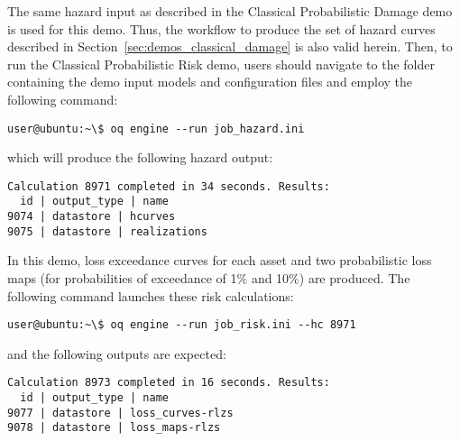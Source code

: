 The same hazard input as described in the Classical Probabilistic Damage demo
is used for this demo. Thus, the workflow to produce the set of hazard curves
described in Section~\ref{sec:demos_classical_damage} is also valid herein.
Then, to run the Classical Probabilistic Risk demo, users should navigate to
the folder containing the demo input models and configuration files and employ
the following command:

\begin{verbatim}
user@ubuntu:~\$ oq engine --run job_hazard.ini
\end{verbatim}

which will produce the following hazard output:

\begin{verbatim}
Calculation 8971 completed in 34 seconds. Results:
  id | output_type | name
9074 | datastore | hcurves
9075 | datastore | realizations
\end{verbatim}

In this demo, loss exceedance curves for each asset and two probabilistic loss
maps (for probabilities of exceedance of 1\% and 10\%) are produced. The
following command launches these risk calculations:

\begin{verbatim}
user@ubuntu:~\$ oq engine --run job_risk.ini --hc 8971
\end{verbatim}

and the following outputs are expected:

\begin{verbatim}
Calculation 8973 completed in 16 seconds. Results:
  id | output_type | name
9077 | datastore | loss_curves-rlzs
9078 | datastore | loss_maps-rlzs
\end{verbatim}

